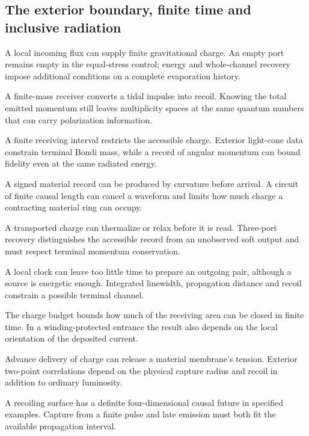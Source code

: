 \subsection{The exterior boundary, finite time and inclusive radiation}
\begin{description}\small
\setlength{\itemsep}{.25em}\setlength{\parskip}{0pt}
\item[\textnormal{\texttt{RES-0124}}] A local incoming flux can supply finite gravitational charge. An empty port remains empty in the equal-stress control; energy and whole-channel recovery impose additional conditions on a complete evaporation history.
\item[\textnormal{\texttt{RES-0125}}] A finite-mass receiver converts a tidal impulse into recoil. Knowing the total emitted momentum still leaves multiplicity spaces at the same quantum numbers that can carry polarization information.
\item[\textnormal{\texttt{RES-0126}}] A finite receiving interval restricts the accessible charge. Exterior light-cone data constrain terminal Bondi mass, while a record of angular momentum can bound fidelity even at the same radiated energy.
\item[\textnormal{\texttt{RES-0127}}] A signed material record can be produced by curvature before arrival. A circuit of finite causal length can cancel a waveform and limits how much charge a contracting material ring can occupy.
\item[\textnormal{\texttt{RES-0128}}] A transported charge can thermalize or relax before it is read. Three-port recovery distinguishes the accessible record from an unobserved soft output and must respect terminal momentum conservation.
\item[\textnormal{\texttt{RES-0129}}] A local clock can leave too little time to prepare an outgoing pair, although a source is energetic enough. Integrated linewidth, propagation distance and recoil constrain a possible terminal channel.
\item[\textnormal{\texttt{RES-0130}}] The charge budget bounds how much of the receiving area can be closed in finite time. In a winding-protected entrance the result also depends on the local orientation of the deposited current.
\item[\textnormal{\texttt{RES-0131}}] Advance delivery of charge can release a material membrane's tension. Exterior two-point correlations depend on the physical capture radius and recoil in addition to ordinary luminosity.
\item[\textnormal{\texttt{RES-0132}}] A recoiling surface has a definite four-dimensional causal future in specified examples. Capture from a finite pulse and late emission must both fit the available propagation interval.

\end{description}
